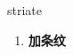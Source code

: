 
\begin{frame}
{\huge striate}
\begin{center}
\begin{enumerate}\Large
  \item \textbf{加条纹}
\end{enumerate}
\end{center}
\end{frame}
